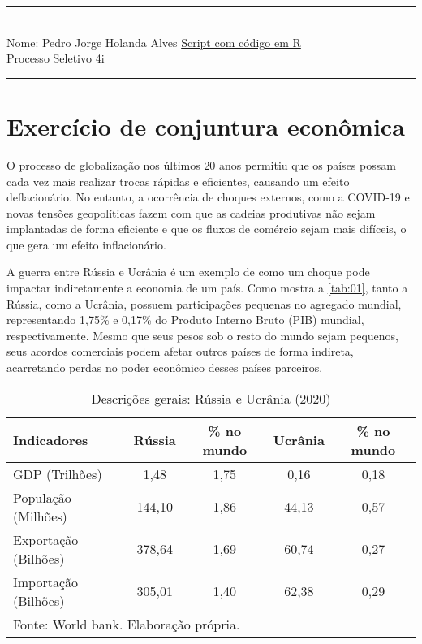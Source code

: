 \documentclass[
article, %
12pt, %
oneside, %
a4paper, %
portuguese, %
portuguese %
]{abntex2}
\begin{document}
\thispagestyle{empty}
\noindent
\rule{17cm}{0.2cm}\\[0.3cm]
Nome:  Pedro Jorge Holanda Alves \hfill \href{https://github.com/PedroJorge7/Processo4i}{Script com código em R}\\[0.1cm]
Processo Seletivo 4i \\
\rule{17cm}{0.05cm}
\vspace{0.1cm}







\section{Exercício de conjuntura econômica}

O processo de globalização nos últimos 20 anos permitiu que os países possam cada vez mais realizar trocas rápidas e eficientes, causando um efeito deflacionário. No entanto, a ocorrência de choques externos, como a COVID-19 e novas tensões geopolíticas fazem com que as cadeias produtivas não sejam implantadas de forma eficiente e que os fluxos de comércio sejam mais difíceis, o que gera um efeito inflacionário.

A guerra entre Rússia e Ucrânia é um exemplo de como um choque pode impactar indiretamente a economia de um país. Como mostra a \autoref{tab:01}, tanto a Rússia, como a Ucrânia, possuem participações pequenas no agregado mundial, representando 1,75\% e 0,17\% do Produto Interno Bruto (PIB) mundial, respectivamente. Mesmo que seus pesos sob o resto do mundo sejam pequenos, seus acordos comerciais podem afetar outros países de forma indireta, acarretando perdas no poder econômico desses países parceiros.

\begin{table}[H] 
  \centering
  \caption{Descrições gerais: Rússia e Ucrânia (2020)}
    \begin{tabular}{l|cccc}
    \hline
    Indicadores & Rússia & \% no mundo & Ucrânia & \% no mundo \\
    \hline
    GDP (Trilhões) & 1,48  & 1,75  & 0,16  & 0,18 \\
    População (Milhões) & 144,10 & 1,86  & 44,13 & 0,57 \\
    Exportação (Bilhões) & 378,64 & 1,69  & 60,74 & 0,27 \\
    Importação (Bilhões) & 305,01 & 1,40  & 62,38 & 0,29 \\
    \hline
    \multicolumn{4}{l}{Fonte: World bank. Elaboração própria.}
    \end{tabular}%
  \label{tab:01}%
\end{table}%
\end{document}
